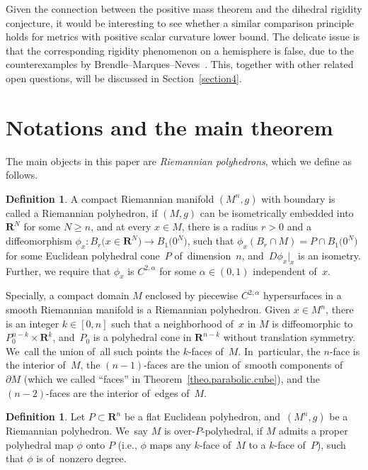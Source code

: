 \documentclass[pdftex]{sigma}
\numberwithin{equation}{section}
\theoremstyle{definition}
\newtheorem{defi}[prop]{Definition}
\newcommand{\RR}{\mathbf{R}}
\begin{document}
Given the connection between the positive mass theorem and the dihedral rigidity conjecture, it would be interesting to see whether a similar comparison principle holds for metrics with positive scalar curvature lower bound. The delicate issue is that the corresponding rigidity phenomenon on a hemisphere is false, due to the counterexamples by Brendle--Marques--Neves~\cite{Brendle2011deformation}. This, together with other related open questions, will be discussed in Section~\ref{section4}.

\section{Notations and the main theorem}
The main objects in this paper are \textit{Riemannian polyhedrons}, which we define as follows.

\begin{defi}A compact Riemannian manifold $(M^n,g)$ with boundary is called a Riemannian polyhedron, if $(M,g)$ can be isometrically embedded into $\RR^N$ for some $N\ge n$, and at every $x\in M$, there is a radius $r>0$ and a diffeomorphism $\phi_x\colon B_r\big(x\in \RR^N\big)\rightarrow B_1\big(0^N\big)$, such that $\phi_x(B_r\cap M)=P\cap B_1\big(0^N\big)$ for some Euclidean polyhedral cone~$P$ of~dimension~$n$, and~$D\phi_x|_x$ is an isometry. Further, we require that $\phi_x$ is $C^{2,\alpha}$ for some $\alpha\in (0,1)$ independent of~$x$.
\end{defi}

Specially, a compact domain $M$ enclosed by piecewise $C^{2,\alpha}$ hypersurfaces in a smooth Riemannian manifold is a Riemannian polyhedron. Given $x\in M^n$, there is an integer $k\in [0, n]$ such that a neighborhood of~$x$ in $M$ is diffeomorphic to $P_0^{n-k}\times \RR^k$, and~$P_0$ is a polyhedral cone in $\RR^{n-k}$ without translation symmetry. We~call the union of~all such points the $k$-faces of~$M$. In~particular, the $n$-face is the interior of~$M$, the $(n-1)$-faces are the union of~smooth components of~$\partial M$ (which we called ``faces'' in Theorem~\ref{theo.parabolic.cube}), and the $(n-2)$-faces are the interior of~edges of~$M$.

\begin{defi}Let $P\subset \RR^n$ be a flat Euclidean polyhedron, and~$(M^n,g)$ be a Riemannian poly\-hedron. We~say $M$ is over-$P$-polyhedral, if $M$ admits a proper polyhedral map $\phi$ onto $P$ (i.e., $\phi$ maps any $k$-face of~$M$ to a $k$-face of~$P$), such that $\phi$ is of~nonzero degree.
\end{defi}
\end{document}
